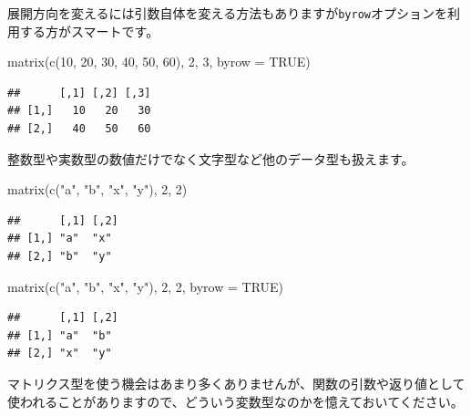 \documentclass[
  12pt,
]{book}
\newenvironment{Shaded}{\begin{snugshade}}{\end{snugshade}}
\newcommand{\AttributeTok}[1]{\textcolor[rgb]{0.77,0.63,0.00}{#1}}
\newcommand{\ConstantTok}[1]{\textcolor[rgb]{0.00,0.00,0.00}{#1}}
\newcommand{\DecValTok}[1]{\textcolor[rgb]{0.00,0.00,0.81}{#1}}
\newcommand{\FunctionTok}[1]{\textcolor[rgb]{0.00,0.00,0.00}{#1}}
\newcommand{\NormalTok}[1]{#1}
\newcommand{\StringTok}[1]{\textcolor[rgb]{0.31,0.60,0.02}{#1}}
\begin{document}
展開方向を変えるには引数自体を変える方法もありますが\texttt{byrow}オプションを利用する方がスマートです。

\begin{Shaded}
\begin{Highlighting}[numbers=left,,]
\FunctionTok{matrix}\NormalTok{(}\FunctionTok{c}\NormalTok{(}\DecValTok{10}\NormalTok{, }\DecValTok{20}\NormalTok{, }\DecValTok{30}\NormalTok{, }\DecValTok{40}\NormalTok{, }\DecValTok{50}\NormalTok{, }\DecValTok{60}\NormalTok{), }\DecValTok{2}\NormalTok{, }\DecValTok{3}\NormalTok{, }\AttributeTok{byrow =} \ConstantTok{TRUE}\NormalTok{)}
\end{Highlighting}
\end{Shaded}

\begin{verbatim}
##      [,1] [,2] [,3]
## [1,]   10   20   30
## [2,]   40   50   60
\end{verbatim}

整数型や実数型の数値だけでなく文字型など他のデータ型も扱えます。

\begin{Shaded}
\begin{Highlighting}[numbers=left,,]
\FunctionTok{matrix}\NormalTok{(}\FunctionTok{c}\NormalTok{(}\StringTok{"a"}\NormalTok{, }\StringTok{"b"}\NormalTok{, }\StringTok{"x"}\NormalTok{, }\StringTok{"y"}\NormalTok{), }\DecValTok{2}\NormalTok{, }\DecValTok{2}\NormalTok{)}
\end{Highlighting}
\end{Shaded}

\begin{verbatim}
##      [,1] [,2]
## [1,] "a"  "x" 
## [2,] "b"  "y"
\end{verbatim}

\begin{Shaded}
\begin{Highlighting}[numbers=left,,]
\FunctionTok{matrix}\NormalTok{(}\FunctionTok{c}\NormalTok{(}\StringTok{"a"}\NormalTok{, }\StringTok{"b"}\NormalTok{, }\StringTok{"x"}\NormalTok{, }\StringTok{"y"}\NormalTok{), }\DecValTok{2}\NormalTok{, }\DecValTok{2}\NormalTok{, }\AttributeTok{byrow =} \ConstantTok{TRUE}\NormalTok{)}
\end{Highlighting}
\end{Shaded}

\begin{verbatim}
##      [,1] [,2]
## [1,] "a"  "b" 
## [2,] "x"  "y"
\end{verbatim}

マトリクス型を使う機会はあまり多くありませんが、関数の引数や返り値として使われることがありますので、どういう変数型なのかを憶えておいてください。
\end{document}
